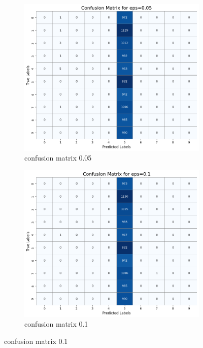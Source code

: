 \documentclass[11pt,onside]{article}
\begin{document}
\begin{figure}[h]
  \centering
  \begin{subfigure}[b]{0.49\textwidth}
    \centering
    \includegraphics[width=\textwidth]{V2_images/confusion_matrix_eps_0.05.png}
    \caption{confusion matrix 0.05}
    \label{fig:image1}
  \end{subfigure}
  \hfill
  \begin{subfigure}[b]{0.49\textwidth}
    \centering
    \includegraphics[width=\textwidth]{V2_images/confusion_matrix_eps_0.1.png}
    \caption{confusion matrix 0.1}
    \label{fig:image2}
  \end{subfigure}

  \label{fig:images}
\end{figure}
\end{document}
